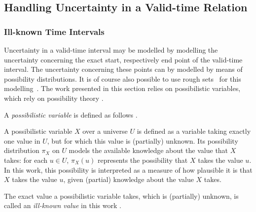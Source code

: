 \subsection{Handling Uncertainty in a Valid-time Relation}

\subsubsection{Ill-known Time Intervals}
\label{subsec:representation-time-intervals}
Uncertainty in a valid-time interval may be modelled by modelling the uncertainty concerning the exact start, respectively end point of the valid-time interval. The uncertainty concerning these points can by modelled by means of possibility distributions. It is of course also possible to use rough sets~\cite{Pawlak1995} for this modelling~\cite{Qia09}. The work presented in this section relies on possibilistic variables, which rely on possibility theory \cite{Dubois:Prade:1988:PossibilityTheory}.

A \emph{possibilistic variable} is defined as follows \cite{Pon11}.

\begin{svgraybox}
\vspace{-10pt}
\begin{definition}
A possibilistic variable $X$ over a universe $U$ is defined as a variable taking exactly one value in $U$, but for which this value is (partially) unknown. Its possibility distribution $\pi_X$ on $U$ models the available knowledge about the value that $X$ takes: for each $u\in U$, $\pi_X(u)$ represents the possibility that $X$ takes the value $u$. In this work, this possibility is interpreted as a measure of how plausible it is that $X$ takes the value $u$, given (partial) knowledge about the value $X$ takes.
\end{definition}
\vspace{-10pt}
\end{svgraybox}

The exact value a possibilistic variable takes, which is (partially) unknown, is called an \emph{ill-known value} in this work \cite{Dubois88b}.

